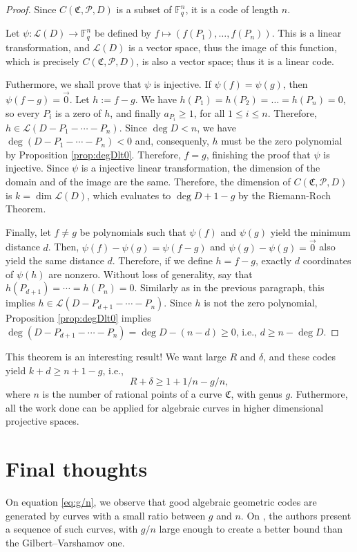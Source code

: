 \documentclass[11pt, oneside]{amsart}
\theoremstyle{definition}
\theoremstyle{remark}
\numberwithin{equation}{section}
\begin{document}
\begin{proof}
	Since $C(\mathfrak C, \mathcal P, D)$ is a subset of $\mathbb{F}_q^n$, it is a code of length $n$.

	Let $\psi: \mathcal L(D) \to \mathbb{F}_q^n$ be defined by $f \mapsto (f(P_1), \dots, f(P_n))$. This is a linear transformation, and $\mathcal L(D)$ is a vector space, thus the image of this function, which is precisely $C(\mathfrak C, \mathcal P, D)$, is also a vector space; thus it is a linear code.

	Futhermore, we shall prove that $\psi$ is injective.
	If $\psi(f) = \psi(g)$, then $\psi(f - g) = \vec 0$.
	Let $h := f-g$.
	We have $h(P_1) = h(P_2) = \dots = h(P_n) = 0$, so every $P_i$ is a zero of $h$, and finally $a_{P_i} \ge 1$, for all $1 \le i \le n$.
	Therefore, $h \in \mathcal L(D - P_1 - \cdots - P_n)$.
	Since $\deg D < n$, we have $\deg(D - P_1 - \cdots - P_n) < 0$ and, consequenly, $h$ must be the zero polynomial by Proposition \ref{prop:degDlt0}.
	Therefore, $f = g$, finishing the proof that $\psi$ is injective.
	Since $\psi$ is a injective linear transformation, the dimension of the domain and of the image are the same.
	Therefore, the dimension of $C(\mathfrak C, \mathcal P, D)$ is $k = \dim \mathcal L(D)$, which evaluates to $\deg D + 1 - g$ by the Riemann-Roch Theorem.

	Finally, let $f \neq g$ be polynomials such that $\psi(f)$ and $\psi(g)$ yield the minimum distance $d$.
	Then, $\psi(f) - \psi(g) = \psi(f-g)$ and $\psi(g) - \psi(g) = \vec 0$ also yield the same distance $d$.
	Therefore, if we define $h = f - g$, exactly  $d$ coordinates of $\psi(h)$ are nonzero.
	Without loss of generality, say that $h(P_{d+1}) = \cdots = h(P_n) = 0$.
	Similarly as in the previous paragraph, this implies $h \in \mathcal L(D - P_{d+1} - \cdots - P_n)$.
	Since $h$ is not the zero polynomial, Proposition \ref{prop:degDlt0} implies $\deg(D - P_{d+1} - \cdots - P_n) = \deg D - (n-d) \ge 0$, i.e., $d \ge n - \deg D$.
\end{proof}

This theorem is an interesting result! We want large $R$ and $\delta$, and these codes yield $k + d \ge n + 1 - g$, i.e., 
	\begin{equation}
		\label{eq:g/n} R + \delta \ge 1 + 1/n - g/n,
	\end{equation}
where $n$ is the number of rational points of a curve $\mathfrak C$, with genus $g$.
Futhermore, all the work done can be applied for algebraic curves in higher dimensional projective spaces.

\section{Final thoughts}\label{s:tvz}

On equation \eqref{eq:g/n}, we observe that good algebraic geometric codes are generated by curves with a small ratio between $g$ and $n$.
On \cite{TVZ82}, the authors present a sequence of such curves, with $g/n$ large enough to create a better bound than the Gilbert--Varshamov one.

\printbibliography
\end{document}
